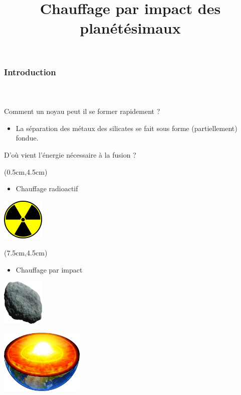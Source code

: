 \documentclass{beamer}
\begin{document}
\title{Chauffage par impact des planétésimaux}
\begin{frame}
\frametitle{Introduction}
\framesubtitle{\ }

\begin{center}
 \Large Comment un noyau peut il se former rapidement ?
\end{center}

\begin{itemize}
\item La séparation des métaux des silicates se fait sous forme (partiellement) fondue.
\end{itemize}

\begin{center}
 \Large D'où vient l'énergie nécessaire à la fusion ?
\end{center}

\begin{textblock*}{5cm}(0.5cm,4.5cm) %
	\center
	\begin{itemize}
		\item Chauffage radioactif
	\end{itemize}
	\vspace{0.1cm}
	
    \includegraphics[width = 2cm]{figures/radioactif.png}
\end{textblock*}

\begin{textblock*}{5cm}(7.5cm,4.5cm) %
	\center
	\begin{itemize}
		\item Chauffage par impact
	\end{itemize}
	
	\vspace{0.1cm}
    \includegraphics[width = 2cm]{figures/asteroid.png}
\end{textblock*}

\center
\vspace{1cm}
\includegraphics[width = 4cm]{figures/terre_core.pdf}

\end{frame}
\end{document}
